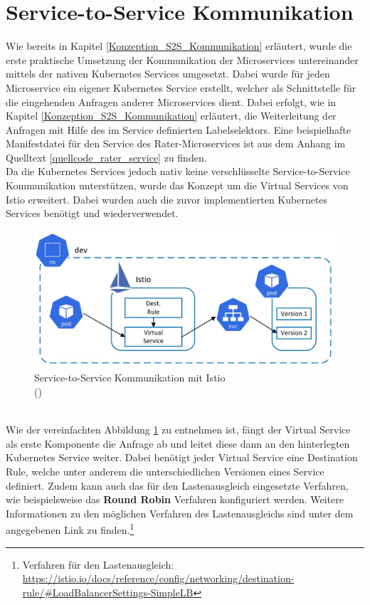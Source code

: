 \section{Service-to-Service Kommunikation}
\label{Umsetzung_S2S_Kommunikation}
Wie bereits in Kapitel \ref{Konzeption_S2S_Kommunikation} erläutert, wurde die erste praktische Umsetzung der Kommunikation der Microservices untereinander mittels der nativen Kubernetes Services umgesetzt. Dabei wurde für jeden Microservice ein eigener Kubernetes Service erstellt, welcher als Schnittstelle für die eingehenden Anfragen anderer Microservices dient. Dabei erfolgt, wie in Kapitel \ref{Konzeption_S2S_Kommunikation} erläutert, die Weiterleitung der Anfragen mit Hilfe des im Service definierten Labelselektors. Eine beispielhafte Manifestdatei für den Service des Rater-Microservices ist aus dem Anhang im Quelltext \ref{quellcode_rater_service} zu finden.\\
\newpage
Da die Kubernetes Services jedoch nativ keine verschlüsselte Service-to-Service Kommunikation unterstützen, wurde das Konzept um die Virtual Services von Istio erweitert. Dabei wurden auch die zuvor implementierten Kubernetes Services benötigt und wiederverwendet.
\\
\begin{figure}[h]
	\begin{center}
		\includegraphics[width=16cm]{img/Istio_S2S_Kommunikation.JPG}
		\caption[Service-to-Service Kommunikation mit Istio]{Service-to-Service Kommunikation mit Istio\\
			(\cite[Eigene Abbildung in Anlehnung an][S. 145]{Sharma.2020})}
		\label{grafik_istio_s2s_kommunikation}
	\end{center}
\end{figure}
\\
Wie der vereinfachten Abbildung \ref{grafik_istio_s2s_kommunikation} zu entnehmen ist, fängt der Virtual Service als erste Komponente die Anfrage ab und leitet diese dann an den hinterlegten Kubernetes Service weiter. Dabei benötigt jeder Virtual Service eine Destination Rule, welche unter anderem die unterschiedlichen Versionen eines Service definiert. Zudem kann auch das für den Lastenausgleich eingesetzte Verfahren, wie beispielsweise das \textbf{Round Robin} Verfahren konfiguriert werden.\autocite[Vgl.][Destination Rule]{IstioAuthors.20191115} Weitere Informationen zu den möglichen Verfahren des Lastenausgleichs sind unter dem angegebenen Link zu finden.\footnote{Verfahren für den Lastenausgleich: \url{https://istio.io/docs/reference/config/networking/destination-rule/\#LoadBalancerSettings-SimpleLB}}\\
